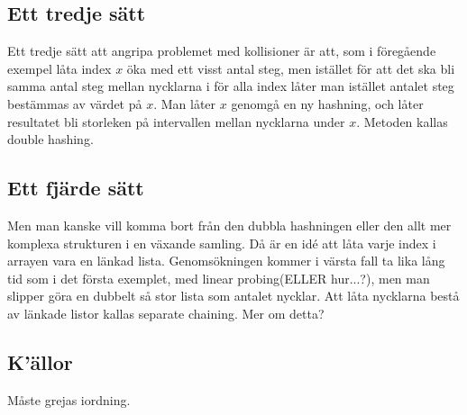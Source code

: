\documentclass[a5paper,10pt,oneside]{article}
\begin{document}
\subsection*{Ett tredje sätt}
Ett tredje sätt att angripa problemet med kollisioner är att, som i föregående exempel låta index $x$ öka med ett visst antal steg, men istället för att det ska bli samma antal steg mellan nycklarna i för alla index låter man istället antalet steg bestämmas av värdet på $x$.
Man låter $x$ genomgå en ny hashning, och låter resultatet bli storleken på intervallen mellan nycklarna under $x$. Metoden kallas double hashing.



\subsection*{Ett fjärde sätt}
Men man kanske vill komma bort från den dubbla hashningen eller den allt mer komplexa strukturen i en växande samling. Då är en idé att låta varje index i arrayen vara en länkad lista. Genomsökningen kommer i värsta fall ta lika lång tid som i det första exemplet, med linear probing(ELLER hur...?), men man slipper göra en dubbelt så stor lista som antalet nycklar. Att låta nycklarna bestå av länkade listor kallas separate chaining. Mer om detta?


\subsection*{K'ällor}
Måste grejas iordning.
\end{document}
